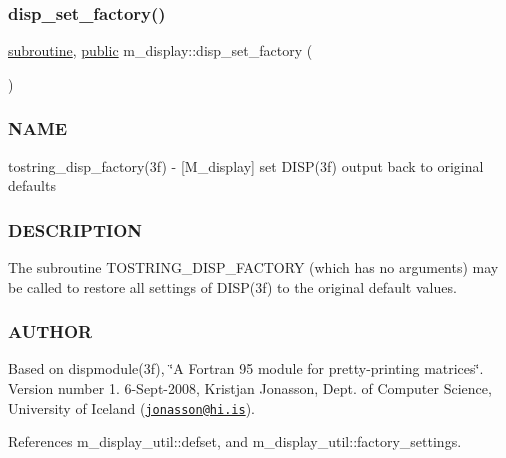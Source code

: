 \subsubsection{\texorpdfstring{disp\+\_\+set\+\_\+factory()}{disp\_set\_factory()}}
{\footnotesize\ttfamily \hyperlink{M__stopwatch_83_8txt_acfbcff50169d691ff02d4a123ed70482}{subroutine}, \hyperlink{M__stopwatch_83_8txt_a2f74811300c361e53b430611a7d1769f}{public} m\+\_\+display\+::disp\+\_\+set\+\_\+factory (\begin{DoxyParamCaption}{ }\end{DoxyParamCaption})}



\subsubsection*{N\+A\+ME}

tostring\+\_\+disp\+\_\+factory(3f) -\/ \mbox{[}M\+\_\+display\mbox{]} set D\+I\+S\+P(3f) output back to original defaults 

\subsubsection*{D\+E\+S\+C\+R\+I\+P\+T\+I\+ON}

The subroutine T\+O\+S\+T\+R\+I\+N\+G\+\_\+\+D\+I\+S\+P\+\_\+\+F\+A\+C\+T\+O\+RY (which has no arguments) may be called to restore all settings of D\+I\+S\+P(3f) to the original default values.

\subsubsection*{A\+U\+T\+H\+OR}

Based on dispmodule(3f), \char`\"{}\+A Fortran 95 module for pretty-\/printing matrices\char`\"{}. Version number 1. 6-\/\+Sept-\/2008, Kristjan Jonasson, Dept. of Computer Science, University of Iceland (\href{mailto:jonasson@hi.is}{\tt jonasson@hi.\+is}). 

References m\+\_\+display\+\_\+util\+::defset, and m\+\_\+display\+\_\+util\+::factory\+\_\+settings.

\mbox{\label{namespacem__display_a1e0883cef47c57b43c8de794fe7724ff}} 
